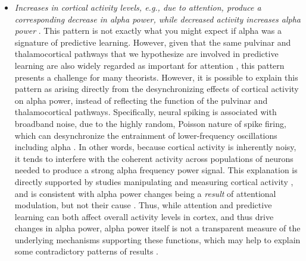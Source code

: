 \documentclass[11pt,twoside]{article}
\newif\myifpdf
\begin{document}
\begin{itemize}
	\item \emph{Increases in cortical activity levels, e.g., due to attention, produce a corresponding decrease in alpha power, while decreased activity increases alpha power}  \citep{WordenFoxeWangEtAl00,KellyLalorReillyEtAl06,KlimeschSausengHanslmayr07,FriesWomelsdorfOostenveldEtAl08,JensenMazaheri10,FosterAwh19}. This pattern is not exactly what you might expect if alpha was a signature of predictive learning.  However, given that the same pulvinar and thalamocortical pathways that we hypothesize are involved in predictive learning are also widely regarded as important for attention \citep{LaBergeBuchsbaum90,BenderYouakim01,SnowAllenRafalEtAl09,SaalmannKastner11,ZhouSchaferDesimone16,FiebelkornKastner19}, this pattern presents a challenge for many theorists.  However, it is possible to explain this pattern as arising directly from the desynchronizing effects of cortical activity on alpha power, instead of reflecting the function of the pulvinar and thalamocortical pathways.  Specifically, neural spiking is associated with broadband noise, due to the highly random, Poisson nature of spike firing, which can desynchronize the entrainment of lower-frequency oscillations including alpha \cite{WaldertLemonKraskov13,RayMaunsell11,PrivmanMalachYeshurun13,SolomonKragelSperlingEtAl17}.  In other words, because cortical activity is inherently noisy, it tends to interfere with the coherent activity across populations of neurons needed to produce a strong alpha frequency power signal.  This explanation is directly supported by studies manipulating and measuring cortical activity \cite{ZhouSchaferDesimone16,FriesWomelsdorfOostenveldEtAl08}, and is consistent with alpha power changes being a \emph{result} of attentional modulation, but not their cause \citep{AntonovChakravarthiAndersen20}.  Thus, while attention and predictive learning can both affect overall activity levels in cortex, and thus drive changes in alpha power, alpha power itself is not a transparent measure of the underlying mechanisms supporting these functions, which may help to explain some contradictory patterns of results \cite{FosterAwh19,GundlachMorattiForschackEtAl20,KeitelKeitelBenwellEtAl19}.
	

\end{itemize}
\end{document}
